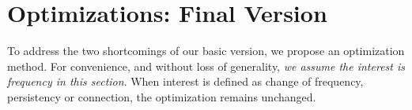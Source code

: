 \presec \vvv
\section{Optimizations: Final Version} \postsec
\label{sec:optimization}
\label{sec:final}

To address the two shortcomings of our basic version, we propose an optimization method. 
For convenience, and without loss of generality, \textit{we assume the interest is frequency in this section}. When interest is defined as change of frequency, persistency or connection, the optimization remains unchanged. 


\begin{comment}

\postsub

The basic version of our algorithm is slow with insertions. 
%
To address this, we accelerate our algorithm by replacing the min-heap with Stream-Summary\cite{spacesaving} and a hash table. 
%
Stream-Summary is a data structure proposed by the authors of SpaceSaving~\cite{spacesaving}. 
%
It can achieve $O(1)$ time complexity for both updating the heap and returning the smallest item. 
%
Stream-Summary is a double-directional linked list consisting of nodes.
%
Each node stores a unique frequency. 
%
For a given node with frequency $f$, it has a linked list storing all the items whose frequency is exactly $f$.
%
In the hash table, the key is the flow ID, and the value is a pointer to the corresponding node in the min-heap.
%
The hash table is used to check whether the incoming flow is in the Stream-Summary, and if so, the corresponding frequency will be incremented by 1.


However, this optimization has inevitable drawbacks.
%
First, Stream-Summary consumes a relatively large amount of memory, since it is a double-directional linked list and each node has four or six pointers. 
%
Second, the hash table also requires a significant amount of memory space to minimize the hash collision rate. 
%
Third, the update process is relatively slow because multiple pointers need to be modified for each update.
\end{comment}

